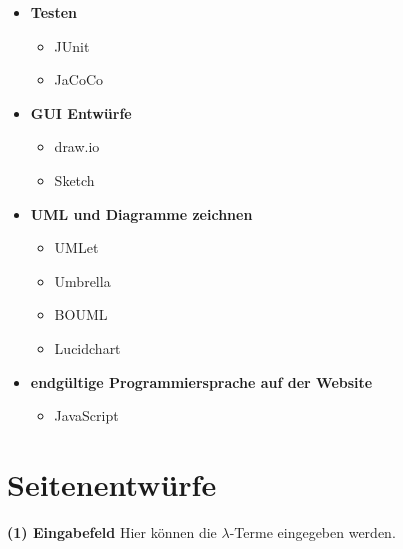 \documentclass[parskip=full,11pt,twoside]{scrartcl}
\begin{document}
\begin{description}
\begin{itemize}
\begin{itemize}
		\end{itemize}
		\item \textbf{Testen}
		\begin{itemize}
			\item JUnit
			\item JaCoCo
		\end{itemize}
		\item \textbf{GUI Entwürfe}
			\begin{itemize}
				\item draw.io
				\item Sketch
			\end{itemize}
		\item \textbf{UML und Diagramme zeichnen}
			\begin{itemize}
				\item UMLet
				\item Umbrella
				\item BOUML
				\item Lucidchart
			\end{itemize}
		\item \textbf{endgültige Programmiersprache auf der Website}
			\begin{itemize}
				\item JavaScript
			\end{itemize}
	\end{itemize}
\newpage
\appendix
\end{description}
\section{Seitenentwürfe}

\newline
\textbf{(1) Eingabefeld}
\newline Hier können die $\lambda$-Terme eingegeben werden.
\end{document}

